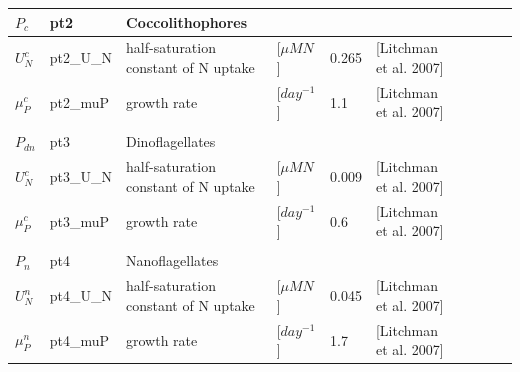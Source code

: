 \begin{tabular}{llllllllll}
  $P_{c}$ & pt2 & Coccolithophores\\
  \hline
  $U^{c}_N$ & pt2\_U\_N & half-saturation constant of N uptake & [$\mu M N$]  &  0.265 & [Litchman et al. 2007]\\
  $\mu^{c}_P$ & pt2\_muP  & growth rate & [$day^{-1}$]& 1.1 & [Litchman et al. 2007] \\
  \\
  $P_{dn}$ & pt3 & Dinoflagellates\\
  \hline
  $U^{c}_N$ & pt3\_U\_N & half-saturation constant of N uptake & [$\mu M N$]  &  0.009 & [Litchman et al. 2007]\\
  $\mu^{c}_P$ & pt3\_muP  & growth rate & [$day^{-1}$] & 0.6 & [Litchman et al. 2007]\\
  \\
  $P_{n}$ & pt4 & Nanoflagellates\\
  \hline
  $U^{n}_N$ & pt4\_U\_N & half-saturation constant of N uptake & [$\mu M N$]  &  0.045 & [Litchman et al. 2007]\\
  $\mu^{n}_P$ & pt4\_muP  & growth rate & [$day^{-1}$] & 1.7 & [Litchman et al. 2007]\\


\end{tabular}
